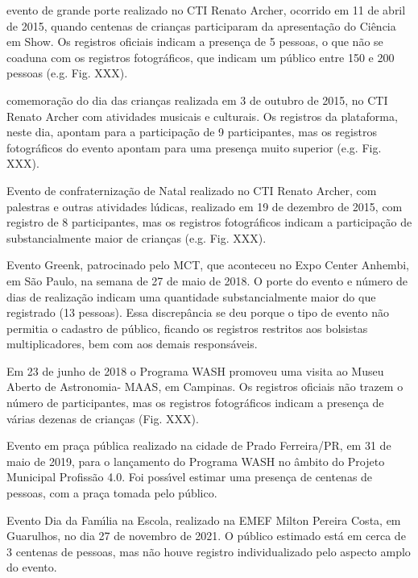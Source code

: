 \documentclass[
12pt,		%
openright,	%
twoside,  %
a4paper,			%
chapter=TITLE,		%
english,			%
french,				%
spanish,			%
brazil				%
]{USPSC-classe/USPSC}
\begin{document}
\begin{alineas}
\item evento de grande porte realizado no CTI Renato Archer, ocorrido em 11 de abril de 2015, quando centenas de crian\c{c}as participaram da apresenta\c{c}\~ao do \textquotedbl Ci\^encia em Show\textquotedbl . Os registros oficiais indicam a presen\c{c}a de 5 pessoas, o que n\~ao se coaduna com os registros fotogr\'aficos, que indicam um p\'ublico entre 150 e 200 pessoas (e.g. Fig. XXX).
\item comemora\c{c}\~ao do dia das crian\c{c}as realizada em 3 de outubro de 2015, no CTI Renato Archer com atividades musicais e culturais. Os registros da plataforma, neste dia, apontam para a participa\c{c}\~ao de 9 participantes, mas os registros fotogr\'aficos do evento apontam para uma presen\c{c}a muito superior (e.g. Fig. XXX).
\item Evento de confraterniza\c{c}\~ao de Natal realizado no CTI Renato Archer, com palestras e outras atividades l\'udicas, realizado em 19 de dezembro de 2015, com registro de 8 participantes, mas os registros fotogr\'aficos indicam a participa\c{c}\~ao de substancialmente maior de crian\c{c}as (e.g. Fig. XXX).
\item Evento Greenk, patrocinado pelo MCT, que aconteceu no Expo Center Anhembi, em S\~ao Paulo, na semana de 27 de maio de 2018. O porte do evento e n\'umero de dias de realiza\c{c}\~ao indicam uma quantidade substancialmente maior do que registrado (13 pessoas). Essa discrep\^ancia se deu porque o tipo de evento n\~ao permitia o cadastro de p\'ublico, ficando os registros restritos aos bolsistas multiplicadores, bem com aos demais respons\'aveis.
\item Em 23 de junho de 2018 o Programa WASH promoveu uma visita ao Museu Aberto de Astronomia- MAAS, em Campinas. Os registros oficiais n\~ao trazem o n\'umero de participantes, mas os registros fotogr\'aficos indicam a presen\c{c}a de v\'arias dezenas de crian\c{c}as (Fig. XXX).
\item Evento em pra\c{c}a p\'ublica realizado na cidade de Prado Ferreira/PR, em 31 de maio de 2019, para o lan\c{c}amento do Programa WASH no \^ambito do Projeto Municipal Profiss\~ao 4.0. Foi poss\'{\i}vel estimar uma presen\c{c}a de centenas de pessoas, com a pra\c{c}a tomada pelo p\'ublico.
\item Evento Dia da Fam\'{\i}lia na Escola, realizado na EMEF Milton Pereira Costa, em Guarulhos, no dia 27 de novembro de 2021. O p\'ublico estimado est\'a em cerca de 3 centenas de pessoas, mas n\~ao houve registro individualizado pelo aspecto amplo do evento.
\end{alineas}
\end{document}
